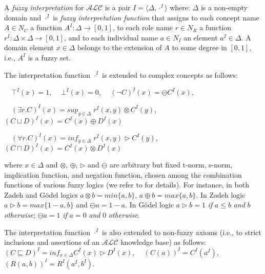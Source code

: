 \documentclass[runningheads]{llncs}
\newcommand{\alc}{\mathcal{ALC}}
\newcommand {\ri} {\rightarrow}
\def \ri{\rightarrow}
\begin{document}
A {\em fuzzy interpretation} for $\alc$ is a pair $I=\langle \Delta, \cdot^I \rangle$ where:
$\Delta$ is a non-empty domain and 
$\cdot^I$ is {\em fuzzy interpretation function} that assigns to each
concept name $A\in N_C$ a function  $A^I :  \Delta \ri [0,1]$,
to each role name $r \in N_R$  a function  $r^I:   \Delta \times  \Delta \ri [0,1]$,
and to each individual name $a\in N_I$ an element $a^I \in  \Delta$.
A domain element $x \in \Delta$ 
belongs to the extension of $A$ to some degree in $[0, 1]$, i.e., $A^I$ is a fuzzy set.

The  interpretation function $\cdot^I$ is extended to complex concepts as follows: 

$\mbox{\ \ \ }$ $\top^I(x)=1$, $\mbox{\ \ \ \ \ \ \ \ \ \  \ \ \ \ \ \ \ \ \ \ }$ $\bot^I(x)=0$,  $\mbox{\ \ \ \ \ \ \ \ \ \ \ \ \ \ \  \ \ \ \ \ }$  $(\neg C)^I(x)= \ominus C^I(x)$, 

$\mbox{\ \ \ }$  $(\exists r.C)^I(x) = sup_{y \in \Delta} \; r^I(x,y) \otimes C^I(y)$,  $\mbox{\ \ \ \ \ \ }$  $(C \sqcup D)^I(x) =C^I(x) \oplus D^I(x)$ 

$\mbox{\ \ \ }$  $(\forall r.C)^I (x) = inf_{y \in \Delta} \;  r^I(x,y) \rhd C^I(y)$, $\mbox{\ \ \ \ \ \ \ }$  $(C \sqcap D)^I(x) =C^I(x) \otimes D^I(x)$ 

\noindent
where  $x \in \Delta$ and $\otimes$, $\oplus$, $\rhd$ and $\ominus$ are arbitrary but fixed t-norm, s-norm, implication function, and negation function, chosen among the combination functions of various fuzzy logics 
(we refer to \cite{LukasiewiczStraccia09} for details). For instance, in both Zadeh and G\"odel logics $a \otimes b= min\{a,b\}$,  $a \oplus b= max\{a,b\}$. In Zadeh logic $a \rhd b= max\{1-a,b\}$ and $ \ominus a = 1-a$. In G\"odel logic  $a \rhd b= 1$ {\em if} $a \leq b$ {\em and} $b$ {\em otherwise};
 $ \ominus a = 1$ {\em if} $a=0$  {\em and} $0$ {\em otherwise}.

The  interpretation function $\cdot^I$ is also extended  to non-fuzzy axioms (i.e., to strict inclusions and assertions of an $\alc$ knowledge base) as follows:\\
 $(C \sqsubseteq D)^I= inf_{x \in \Delta}  C^I(x) \rhd D^I(x)$,
$\mbox{\ \ \ }$  $(C(a))^I=C^I(a^I)$,  $\mbox{\ \ \ }$  $(R(a,b))^I=R^I(a^I,b^I)$.
\end{document}
